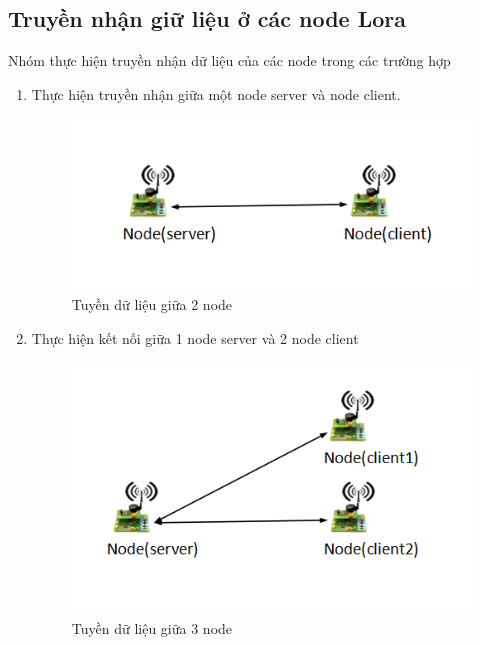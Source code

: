 \subsection{Truyền nhận giữ liệu ở các node Lora}
Nhóm thực hiện truyền nhận dữ liệu của các node trong các trường hợp
\begin{enumerate}
    \item Thực hiện truyền nhận giữa một node server và node client.
\begin{center}
    \begin{figure}[htp]
    \begin{center}
     \includegraphics[scale=.8]{image6/2node.png}
    \end{center}
    \caption{Tuyền dữ liệu giữa 2 node}
    \label{refhinh1}
    \end{figure}
\end{center}
    \item Thực hiện kết nối giữa 1 node server và 2 node client
\begin{center}
    \begin{figure}[htp]
    \begin{center}
     \includegraphics[scale=.8]{image6/3node.png}
    \end{center}
    \caption{Tuyền dữ liệu giữa 3 node}

\end{figure}
\end{center}
\end{enumerate}
